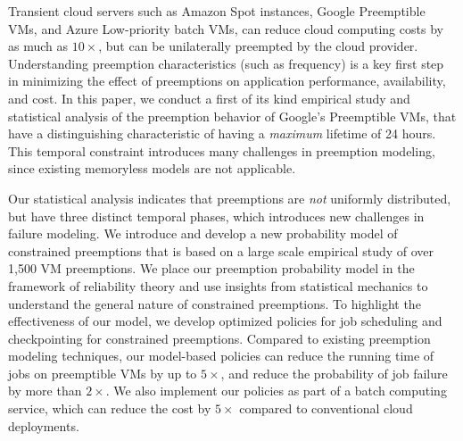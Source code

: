 Transient cloud servers such as Amazon Spot instances, Google Preemptible VMs, and Azure Low-priority batch VMs, can reduce cloud computing costs by as much as $10\times$, but can be unilaterally preempted by the cloud provider.
Understanding preemption characteristics (such as frequency) is a key first step in minimizing the effect of preemptions on application performance, availability, and cost. 
In this paper, we conduct a first of its kind empirical study and statistical analysis of the preemption behavior of Google's Preemptible VMs, 
that have a distinguishing characteristic of having a \emph{maximum} lifetime of 24 hours. 
This temporal constraint introduces many challenges in preemption modeling, since existing memoryless models are not applicable. 

Our statistical analysis indicates that preemptions are \emph{not} uniformly distributed, but have three distinct temporal phases, which introduces new challenges in failure modeling.  
We introduce and develop a new probability model of constrained preemptions that is based on a large scale empirical study of over 1,500 VM preemptions. 
We place our preemption probability model in the framework of reliability theory and use insights from statistical mechanics to understand the general nature of constrained preemptions. 
To highlight the effectiveness of our model, we develop optimized policies for job scheduling and checkpointing for constrained preemptions. 
Compared to existing preemption modeling techniques, our model-based policies can reduce the running time of jobs on preemptible VMs by up to $5\times$, and reduce the probability of job failure by more than $2\times$. 
We also implement our policies as part of a batch computing service, which can reduce the cost by $5\times$ compared to conventional cloud deployments.







